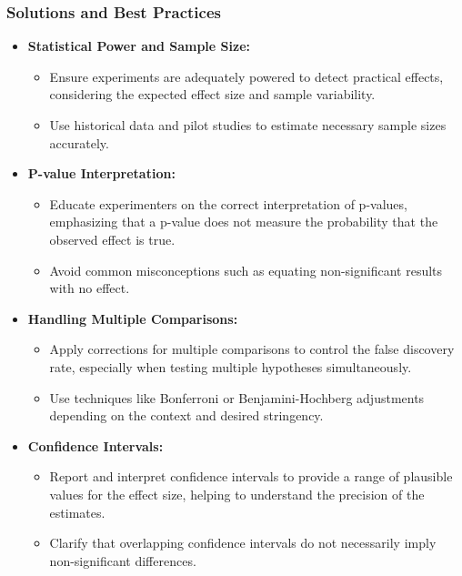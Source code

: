 \documentclass{article}
\begin{document}
\subsubsection*{Solutions and Best Practices}
\begin{itemize}
    \item \textbf{Statistical Power and Sample Size:}
    \begin{itemize}
        \item Ensure experiments are adequately powered to detect practical effects, considering the expected effect size and sample variability.
        \item Use historical data and pilot studies to estimate necessary sample sizes accurately.
    \end{itemize}

    \item \textbf{P-value Interpretation:}
    \begin{itemize}
        \item Educate experimenters on the correct interpretation of p-values, emphasizing that a p-value does not measure the probability that the observed effect is true.
        \item Avoid common misconceptions such as equating non-significant results with no effect.
    \end{itemize}

    \item \textbf{Handling Multiple Comparisons:}
    \begin{itemize}
        \item Apply corrections for multiple comparisons to control the false discovery rate, especially when testing multiple hypotheses simultaneously.
        \item Use techniques like Bonferroni or Benjamini-Hochberg adjustments depending on the context and desired stringency.
    \end{itemize}

    \item \textbf{Confidence Intervals:}
    \begin{itemize}
        \item Report and interpret confidence intervals to provide a range of plausible values for the effect size, helping to understand the precision of the estimates.
        \item Clarify that overlapping confidence intervals do not necessarily imply non-significant differences.
    \end{itemize}


\end{itemize}
\end{document}
